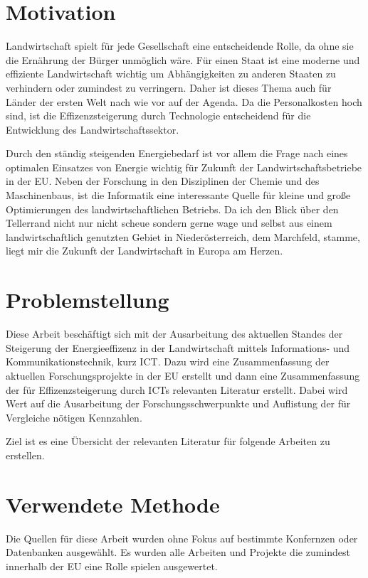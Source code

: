 \section{Motivation}

Landwirtschaft spielt für jede Gesellschaft eine entscheidende Rolle, da ohne sie die Ernährung der Bürger unmöglich wäre. Für einen Staat ist eine moderne und effiziente Landwirtschaft wichtig um Abhängigkeiten zu anderen Staaten zu verhindern oder zumindest zu verringern. Daher ist dieses Thema auch für Länder der ersten Welt nach wie vor auf der Agenda. Da die Personalkosten hoch sind, ist die Effizenzsteigerung durch Technologie entscheidend für die Entwicklung des Landwirtschaftssektor.

Durch den ständig steigenden Energiebedarf ist vor allem die Frage nach eines optimalen Einsatzes von Energie wichtig für Zukunft der Landwirtschaftsbetriebe in der EU. Neben der Forschung in den Disziplinen der Chemie und des Maschinenbaus, ist die Informatik eine interessante Quelle für kleine und große Optimierungen des landwirtschaftlichen Betriebs. Da ich den Blick über den Tellerrand nicht nur nicht scheue sondern gerne wage und selbst aus einem landwirtschaftlich genutzten Gebiet in Niederösterreich, dem Marchfeld, stamme, liegt mir die Zukunft der Landwirtschaft in Europa am Herzen.

\section{Problemstellung}

Diese Arbeit beschäftigt sich mit der Ausarbeitung des aktuellen Standes der Steigerung der Energieeffizenz in der Landwirtschaft mittels Informations- und Kommunikationstechnik, kurz ICT. Dazu wird eine Zusammenfassung der aktuellen Forschungsprojekte in der EU erstellt und dann eine Zusammenfassung der für Effizenzsteigerung durch ICTs relevanten Literatur erstellt. Dabei wird Wert auf die Ausarbeitung der Forschungsschwerpunkte und Auflistung der für Vergleiche nötigen Kennzahlen.

Ziel ist es eine Übersicht der relevanten Literatur für folgende Arbeiten zu erstellen.

\section{Verwendete Methode}

Die Quellen für diese Arbeit wurden ohne Fokus auf bestimmte Konfernzen oder Datenbanken ausgewählt. Es wurden alle Arbeiten und Projekte die zumindest innerhalb der EU eine Rolle spielen ausgewertet.

